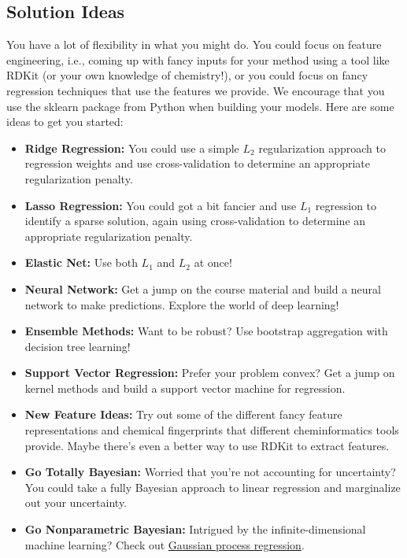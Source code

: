 \documentclass[12pt]{article}
\begin{document}
	\subsection*{Solution Ideas}  You have a lot of flexibility in what you might do.  You could focus on feature engineering, i.e., coming up with fancy inputs for your method using a tool like RDKit (or your own knowledge of chemistry!), or you could focus on fancy regression techniques that use the features we provide. We encourage that you use the sklearn package from Python when building your models.  Here are some ideas to get you started:
	\begin{itemize}
		
		\item \textbf{Ridge Regression:} You could use a simple $L_2$ regularization approach to regression weights and use cross-validation to determine an appropriate regularization penalty.
		\item \textbf{Lasso Regression:} You could got a bit fancier and use $L_1$ regression to identify a sparse solution, again using cross-validation to determine an appropriate regularization penalty.
		\item \textbf{Elastic Net:} Use both $L_1$ and $L_2$ at once!
		\item \textbf{Neural Network:} Get a jump on the course material and build a neural network to make predictions.  Explore the world of deep learning!
		\item \textbf{Ensemble Methods:}
		Want to be robust?  Use bootstrap aggregation with decision tree learning! 
		\item \textbf{Support Vector Regression:} Prefer your problem convex? Get a jump on kernel methods and build a support vector machine for regression.
		\item \textbf{New Feature Ideas:} Try out some of the different fancy feature representations and chemical fingerprints that different cheminformatics tools provide.  Maybe there's even a better way to use RDKit to extract features.
		\item \textbf{Go Totally Bayesian:} Worried that you're not accounting for uncertainty?  You could take a fully Bayesian approach to linear regression and marginalize out your uncertainty.
		\item \textbf{Go Nonparametric Bayesian:} Intrigued by the infinite-dimensional machine learning?  Check out \href{http://www.gaussianprocess.org/gpml/}{Gaussian process regression}.
		
	\end{itemize}
	
	
	
\end{document}
